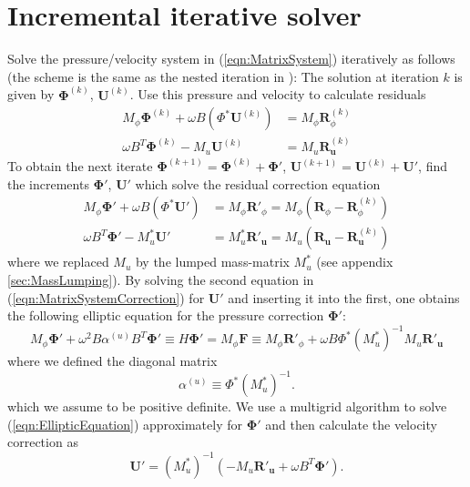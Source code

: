 \documentclass[12pt]{article}
\renewcommand{\vec}[1]{\boldsymbol{#1}}
\begin{document}
\section{Incremental iterative solver}
Solve the pressure/velocity system in (\ref{eqn:MatrixSystem}) iteratively as follows (the scheme is the same as the nested iteration in \cite{Wilson2010}):
The solution at iteration $k$ is given by $\vec{\Phi}^{(k)}$, $\vec{U}^{(k)}$.
 Use this pressure and velocity to calculate residuals
\begin{equation}
 \begin{aligned}
  M_{\phi} \vec{\Phi}^{(k)} + \omega B (\Phi^* \vec{U}^{(k)}) &= M_{\phi}\vec{R}^{(k)}_\phi \\
\omega B^T \vec{\Phi}^{(k)} -  M_{u} \vec{U}^{(k)}   &= M_u \vec{R}^{(k)}_{\vec{u}}
 \end{aligned}
\end{equation}
To obtain the next iterate $\vec{\Phi}^{(k+1)} = \vec{\Phi}^{(k)}+\vec{\Phi}'$, $\vec{U}^{(k+1)} = \vec{U}^{(k)}+\vec{U}'$, find the increments $\vec{\Phi}'$, $\vec{U}'$ which solve the residual correction equation
\begin{equation}
 \begin{aligned}
  M_{\phi} \vec{\Phi}' + \omega B (\Phi^* \vec{U}') &= M_{\phi}\vec{R}'_\phi
= M_\phi\left(\vec{R}_\phi-\vec{R}^{(k)}_\phi\right)\\
  \omega B^T \vec{\Phi}' - M^*_{u} \vec{U}' &= M^*_u \vec{R}'_{\vec{u}}
= {M_u} \left(\vec{R}_{\vec{u}}-\vec{R}^{(k)}_{\vec{u}}\right)
 \end{aligned}
\label{eqn:MatrixSystemCorrection}
\end{equation}
where we replaced $M_u$ by the lumped mass-matrix $M_u^*$ (see appendix \ref{sec:MassLumping}). By solving the second equation in (\ref{eqn:MatrixSystemCorrection}) for $\vec{U}'$ and inserting it into the first, one obtains the following elliptic equation for the pressure correction $\vec{\Phi}'$:
\begin{equation}
  M_{\phi}\vec{\Phi}' + \omega^2 B \alpha^{(u)} B^T \vec{\Phi}'
  \equiv H\vec{\Phi}' = M_{\phi}\vec{F} \equiv M_{\phi}\vec{R}'_{\phi}+\omega B \Phi^* \left(M_u^*\right)^{-1}M_u\vec{R}'_{\vec{u}}
\label{eqn:EllipticEquation}
\end{equation}
where we defined the diagonal matrix
\begin{equation}
  \alpha^{(u)} \equiv \Phi^* \left(M_u^*\right)^{-1}.
\end{equation}
which we assume to be positive definite. We use a multigrid algorithm to solve 
(\ref{eqn:EllipticEquation}) approximately for $\vec{\Phi}'$ and then calculate the velocity correction as 
\begin{equation}
  \vec{U}' = \left(M_u^*\right)^{-1}\left(-M_u\vec{R}'_{\vec{u}}+ \omega B^T \vec{\Phi}'\right).
\end{equation}
\end{document}
